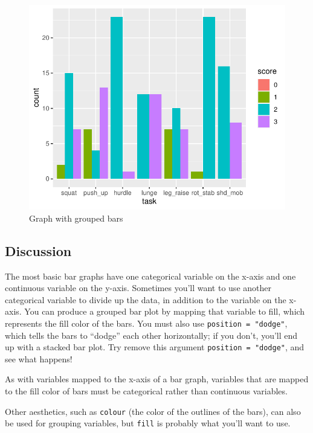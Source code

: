 \documentclass[
]{book}
\begin{document}
\begin{figure}

{\centering \includegraphics{se201_stats_book_files/figure-latex/FIG-BAR-GRAPH-GROUPED-BAR2-1} 

}

\caption[Graph with grouped bars]{Graph with grouped bars}\label{fig:FIG-BAR-GRAPH-GROUPED-BAR2}
\end{figure}

\hypertarget{discussion-9}{%
\subsection{Discussion}\label{discussion-9}}

The most basic bar graphs have one categorical variable on the x-axis and one continuous variable on the y-axis. Sometimes you'll want to use another categorical variable to divide up the data, in addition to the variable on the x-axis. You can produce a grouped bar plot by mapping that variable to fill, which represents the fill color of the bars. You must also use \texttt{position\ =\ "dodge"}, which tells the bars to ``dodge'' each other horizontally; if you don't, you'll end up with a stacked bar plot. Try remove this argument \texttt{position\ =\ "dodge"}, and see what happens!

As with variables mapped to the x-axis of a bar graph, variables that are mapped to the fill color of bars must be categorical rather than continuous variables.

Other aesthetics, such as \texttt{colour} (the color of the outlines of the bars), can also be used for grouping variables, but \texttt{fill} is probably what you'll want to use.
\end{document}
